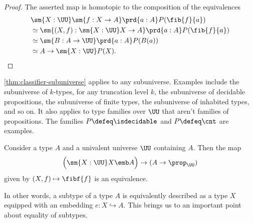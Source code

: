 \begin{proof}
  The asserted map is homotopic to the composition of the equivalences
  \begin{align*}
    & \sm{X:\UU}\sm{f:X\to A}\prd{a:A}P(\fib{f}{a}) \\
    & \simeq \sm{(X,f):\sm{X:\UU}X\to A}\prd{a:A}P(\fib{f}{a}) \\
    & \simeq \sm{B:A\to \UU}\prd{a:A}P(B(a)) \\
    & \simeq A\to\sm{X:\UU}P(X).\qedhere
  \end{align*}
\end{proof}

\cref{thm:classifier-subuniverse} applies to any subuniverse. Examples include the subuniverse of $k$-types, for any truncation level $k$, the subuniverse of decidable propositions, the subuniverse of finite types, the subuniverse of inhabited types, and so on. It also applies to type families over $\UU$ that aren't families of propositions. The families $P\defeq\isdecidable$ and $P\defeq\cnt$ are examples.

\begin{cor}\label{cor:subtype}
  Consider a type $A$ and a univalent universe $\UU$ containing $A$. Then the map
  \begin{equation*}
    \Big(\sm{X:\UU}X\emb A\Big)\to (A\to\prop_\UU)
  \end{equation*}
  given by $(X,f)\mapsto \fibf{f}$ is an equivalence.
\end{cor}

In other words, a subtype of a type $A$ is equivalently described as a type $X$ equipped with an embedding $e:X\hookrightarrow A$. This brings us to an important point about equality of subtypes.

